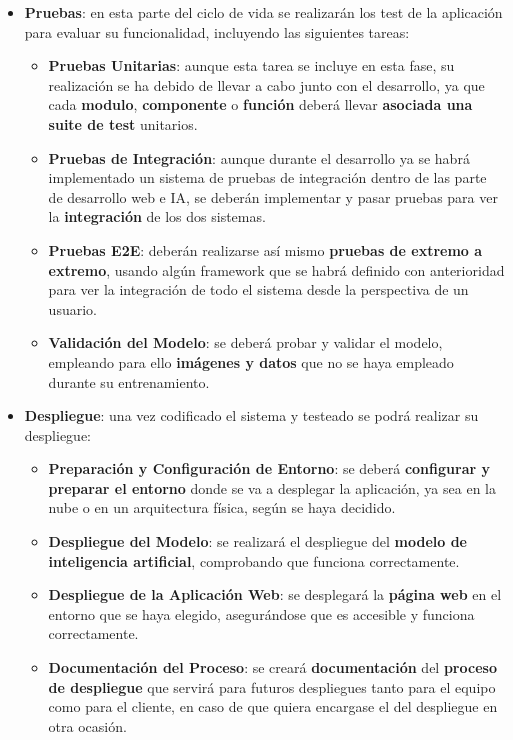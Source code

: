 \begin{itemize}
	\item \textbf{Pruebas}: en esta parte del ciclo de vida se realizarán los test de la aplicación para evaluar su funcionalidad, incluyendo las siguientes tareas:
	\begin{itemize}
		\item \textbf{Pruebas Unitarias}: aunque esta tarea se incluye en esta fase, su realización se ha debido de llevar a cabo junto con el desarrollo, ya que cada \textbf{modulo}, \textbf{componente} o \textbf{función} deberá llevar \textbf{asociada una suite de test} unitarios.
		\item \textbf{Pruebas de Integración}: aunque durante el desarrollo ya se habrá implementado un sistema de pruebas de integración dentro de las parte de desarrollo web e IA, se deberán implementar y pasar pruebas para ver la \textbf{integración} de los dos sistemas.
		\item \textbf{Pruebas E2E}: deberán realizarse así mismo \textbf{pruebas de extremo a extremo}, usando algún framework que se habrá definido con anterioridad para ver la integración de todo el sistema desde la perspectiva de un usuario.
		\item \textbf{Validación del Modelo}: se deberá probar y validar el modelo, empleando para ello \textbf{imágenes y datos} que no se haya empleado durante su entrenamiento. 
	\end{itemize}
	
	\item \textbf{Despliegue}: una vez codificado el sistema y testeado se podrá realizar su despliegue:
	\begin{itemize}
		\item \textbf{Preparación y Configuración de Entorno}: se deberá \textbf{configurar y preparar el entorno} donde se va a desplegar la aplicación, ya sea en la nube o en un arquitectura física, según se haya decidido.
		\item \textbf{Despliegue del Modelo}: se realizará el despliegue del \textbf{modelo de inteligencia artificial}, comprobando que funciona correctamente.
		\item \textbf{Despliegue de la Aplicación Web}: se desplegará la \textbf{página web} en el entorno que se haya elegido, asegurándose que es accesible y funciona correctamente.
		\item \textbf{Documentación del Proceso}: se creará \textbf{documentación} del \textbf{proceso de despliegue} que servirá para futuros despliegues tanto para el equipo como para el cliente, en caso de que quiera encargase el del despliegue en otra ocasión. 
	\end{itemize}
	

\end{itemize}
